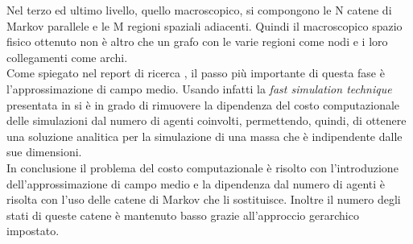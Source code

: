 Nel terzo ed ultimo livello, quello macroscopico, si compongono le N catene di Markov parallele e le M regioni spaziali adiacenti. Quindi il macroscopico spazio fisico ottenuto non è altro che un grafo con le varie regioni come nodi e i loro collegamenti come archi.\\
Come spiegato nel report di ricerca \cite{hierarchical-report}, il passo più importante di questa fase è l'approssimazione di campo medio. Usando infatti la \textit{fast simulation technique} presentata in \cite{mean-field} si è in grado di rimuovere la dipendenza del costo computazionale delle simulazioni dal numero di agenti coinvolti, permettendo, quindi, di ottenere una soluzione analitica per la simulazione di una massa che è indipendente dalle sue dimensioni.\\
In conclusione il problema del costo computazionale è risolto con l'introduzione dell'approssimazione di campo medio e la dipendenza dal numero di agenti è risolta con l'uso delle catene di Markov che li sostituisce. Inoltre il numero degli stati di queste catene è mantenuto basso grazie all'approccio gerarchico impostato.
